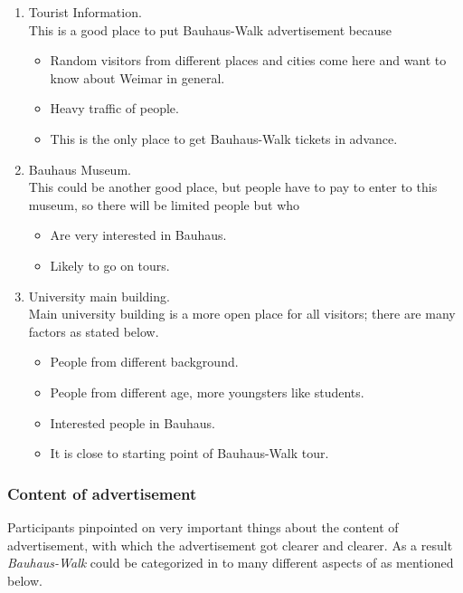 \begin {enumerate}

\item	Tourist Information. \\
This is a good place to put Bauhaus-Walk advertisement because 
\begin {itemize}
\item	Random visitors from different places and cities come here and want to know about Weimar in general. 
\item	Heavy traffic of people.
\item	This is the only place to get Bauhaus-Walk tickets in advance.
\end{itemize}


\item	Bauhaus Museum. \\
This could be another good place, but people have to pay to enter to this museum, so there will be limited people but who
\begin {itemize}
\item	Are very interested in Bauhaus.
\item	Likely to go on tours.
\end{itemize}


\item	University main building. \\
Main university building is a more open place for all visitors; there are many factors as stated below.

\begin {itemize}
\item	People from different background.	
\item	People from different age, more youngsters like students.
\item	Interested people in Bauhaus.
\item	It is close to starting point of Bauhaus-Walk tour.
\end{itemize}


\end{enumerate}


\subsubsection{Content of advertisement}
Participants pinpointed on very important things about the content of advertisement, with which the advertisement got clearer and clearer. As a result \emph{Bauhaus-Walk} could be categorized in to many different aspects of as mentioned below.


